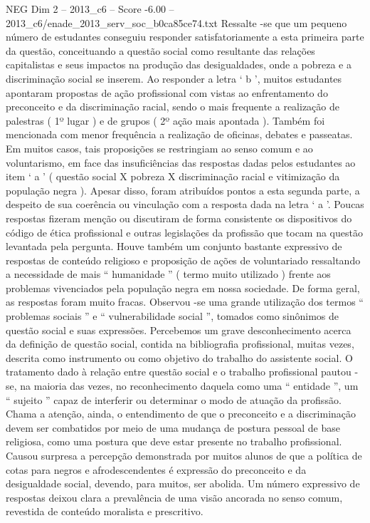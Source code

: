 \begin{textsample}{NEG Dim 2 – 2013\_c6 – Score -6.00 – 2013\_c6/enade\_2013\_serv\_soc\_b0ca85ce74.txt}
Ressalte -se que um pequeno número de estudantes conseguiu responder satisfatoriamente a esta primeira parte da questão, conceituando a questão social como resultante das relações capitalistas e seus impactos na produção das desigualdades, onde a pobreza e a discriminação social se inserem.
Ao responder a letra ‘ b ’, muitos estudantes apontaram propostas de ação profissional com vistas ao enfrentamento do preconceito e da discriminação racial, sendo o mais frequente a realização de palestras ( 1º lugar ) e de grupos ( 2º ação mais apontada ).
Também foi mencionada com menor frequência a realização de oficinas, debates e passeatas.
Em muitos casos, tais proposições se restringiam ao senso comum e ao voluntarismo, em face das insuficiências das respostas dadas pelos estudantes ao item ‘ a ’ ( questão social X pobreza X discriminação racial e vitimização da população negra ).
Apesar disso, foram atribuídos pontos a esta segunda parte, a despeito de sua coerência ou vinculação com a resposta dada na letra ‘ a ’.
Poucas respostas fizeram menção ou discutiram de forma consistente os dispositivos do código de ética profissional e outras legislações da profissão que tocam na questão levantada pela pergunta.
Houve também um conjunto bastante expressivo de respostas de conteúdo religioso e proposição de ações de voluntariado ressaltando a necessidade de mais “ humanidade ” ( termo muito utilizado ) frente aos problemas vivenciados pela população negra em nossa sociedade.
De forma geral, as respostas foram muito fracas.
Observou -se uma grande utilização dos termos “ problemas sociais ” e “ vulnerabilidade social ”, tomados como sinônimos de questão social e suas expressões.
Percebemos um grave desconhecimento acerca da definição de questão social, contida na bibliografia profissional, muitas vezes, descrita como instrumento ou como objetivo do trabalho do assistente social.
O tratamento dado à relação entre questão social e o trabalho profissional pautou -se, na maioria das vezes, no reconhecimento daquela como uma “ entidade ”, um “ sujeito ” capaz de interferir ou determinar o modo de atuação da profissão.
Chama a atenção, ainda, o entendimento de que o preconceito e a discriminação devem ser combatidos por meio de uma mudança de postura pessoal de base religiosa, como uma postura que deve estar presente no trabalho profissional.
Causou surpresa a percepção demonstrada por muitos alunos de que a política de cotas para negros e afrodescendentes é expressão do preconceito e da desigualdade social, devendo, para muitos, ser abolida.
Um número expressivo de respostas deixou clara a prevalência de uma visão ancorada no senso comum, revestida de conteúdo moralista e prescritivo.

\end{textsample}
